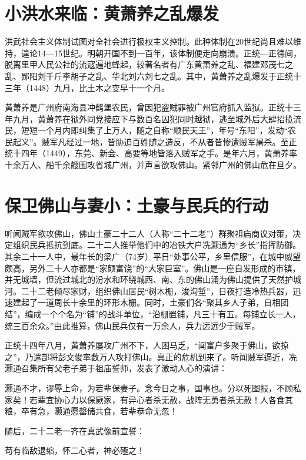 \section*{小洪水来临：黄萧养之乱爆发}

洪武社会主义体制试图对全社会进行极权主义控制。此种体制在20世纪尚且难以维持，遑论14—15世纪。明朝开国不到一百年，该体制便走向崩溃。正统—正德间，脱离里甲人民公社的流寇遍地蜂起，较著名者有广东黄萧养之乱、福建邓茂七之乱、郧阳刘千斤李胡子之乱、华北刘六刘七之乱。其中，黄萧养之乱爆发于正统十三年（1448）九月，比土木之变早十一个月。

黄萧养是广州府南海县冲鹤堡农民，曾因犯盗贼罪被广州官府抓入监狱。正统十三年九月，黄萧养在狱外同党接应下与数百名囚犯同时越狱，逃至城外后大肆招揽流民，短短一个月内即纠集了上万人，随之自称“顺民天王”，年号“东阳”，发动“农民起义”。贼军凡经过一地，皆胁迫百姓随之造反，不从者皆惨遭贼军屠杀。至正统十四年（1449），东莞、新会、高要等地皆落入贼军之手。是年六月，黄萧养率十余万人、船千余艘围攻省城广州，并声言欲攻佛山。紧邻广州的佛山危在旦夕。

\section*{保卫佛山与妻小：土豪与民兵的行动}

听闻贼军欲攻佛山，佛山土豪二十二人（人称“二十二老”）群聚祖庙商议对策，决定组织民兵抵抗到底。二十二人推举他们中的冶铁大户冼灏通为“乡长”指挥防御。其余二十一人中，最年长的梁广（74岁）平日“处事公平，乡里信服”，在城中威望颇高，另外二十人亦都是“家颇富饶”的“大家巨室”。佛山是一座自发形成的市镇，并无城墙，但流过城北的汾水和环绕城西、南、东的佛山涌为佛山提供了天然护城河。二十二老倾尽家财，组织佛山居民“树木栅，浚沟堑”，日夜打造冷热兵器，迅速建起了一道周长十余里的环形木栅。同时，土豪们各“聚其乡人子弟，自相团结”，编成一个个名为“铺”的战斗单位，“沿栅置铺，凡三十有五。每铺立长一人，统三百余众。”由此推算，佛山民兵仅有一万余人，兵力远远少于贼军。

正统十四年八月，黄萧养屡攻广州不下，人困马乏，“闻富户多聚于佛山，欲掠之”，乃遣部将彭文俊率数万人攻打佛山。真正的危机到来了。听闻贼军逼近，冼灏通召集所有父老子弟于祖庙誓师，发表了激动人心的演讲：

灏通不才，谬辱上命，为若辈保妻子。念今日之事，国事也。分以死图报，不顾私家矣！若辈宜协心力以保厥家，有异心者杀无赦，战阵无勇者杀无赦！人各食其粮，卒有急，灏通愿罄储共食，若辈恭命无忽！

随后，二十二老一齐在真武像前宣誓：

苟有临敌退缩，怀二心者，神必殛之！

